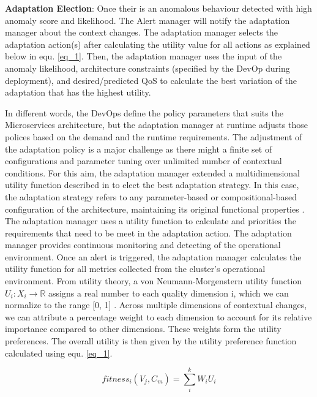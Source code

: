 \documentclass[sigconf]{acmart}
\begin{document}
\textbf{Adaptation Election}: Once their is an anomalous behaviour detected with high anomaly score and likelihood. The Alert manager will notify the adaptation manager about the context changes. The adaptation manager selects the adaptation action(s) after calculating the utility value for all actions as explained below in equ. \ref{eq_1}. Then, the adaptation manager uses the input of the anomaly likelihood, architecture constraints (specified by the DevOp during deployment), and desired/predicted QoS to calculate the best variation of the adaptation that has the highest utility. 

In different words, the DevOps define the policy parameters that suits the Microservices architecture, but the adaptation manager at runtime adjusts those polices based on the demand and the runtime requirements. The adjustment of the adaptation policy is a major challenge as there might a finite set of configurations and parameter tuning over unlimited number of contextual conditions. For this aim, the adaptation manager extended a multidimensional utility function described in \cite{KonstantinosKakousis:2008ub} to elect the best adaptation strategy. In this case, the adaptation strategy refers to any parameter-based or compositional-based configuration of the architecture, maintaining its original functional properties \cite{KonstantinosKakousis:2008ub}. The adaptation manager uses a utility function to calculate and priorities the requirements that need to be meet in the adaptation action. The adaptation manager provides continuous monitoring and detecting of the operational environment. Once an alert is triggered, the adaptation manager calculates the utility function for all metrics collected from the cluster's operational environment. 
From utility theory, a von Neumann-Morgenstern utility function $U_{i} : X_{i} \rightarrow \mathbb{R}$ 
assigns a real number to each quality dimension i, which we can normalize to the range [0, 1] \cite{fishburn1979two}. Across multiple dimensions of contextual changes, we can attribute a percentage weight to each dimension to account for its relative importance compared to other dimensions. These weights form the utility preferences. The overall utility is then given by the utility preference function calculated using equ. \ref{eq_1}. 

\begin{equation}
\label{eq_1}
fitness_{i}(V_{j},C_{m}) = \sum_{i}^{k} W_{i} U_{i}
\end{equation}
\end{document}
